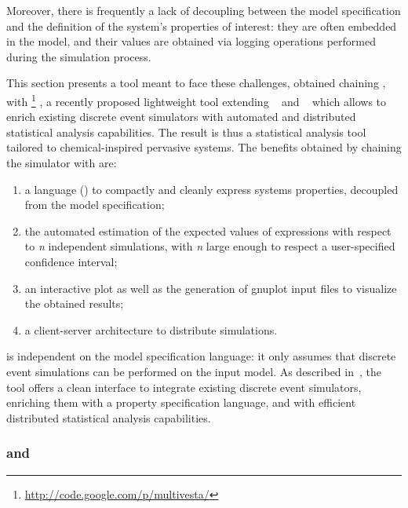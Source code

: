 \documentclass[12pt,a4paper,twoside,openright]{book}
\begin{document}
Moreover, there is frequently a lack of decoupling between the model specification and the definition of the system's properties of interest: they are often embedded in the model, and their values are obtained via logging operations performed during the simulation process.

This section presents a tool meant to face these challenges, obtained chaining \alchemist{}, with \multivesta{}\footnote{\url{http://code.google.com/p/multivesta/}} \cite{multivesta}, a recently proposed lightweight tool extending \vesta{}~\cite{Sen:2005} and \pvesta{}~\cite{AlTurkiM11} which allows to enrich existing discrete event simulators with automated and distributed statistical analysis capabilities.
%
The result is thus a statistical analysis tool tailored to chemical-inspired pervasive systems.
%
The benefits obtained by chaining the simulator with \multivesta{} are:
\begin{enumerate}
 \item a language (\multiquatex) to compactly and cleanly express systems properties, decoupled from the model specification;
 \item the automated estimation of the expected values of \multiquatex{} expressions with respect to \emph{n} independent simulations, with \emph{n} large enough to respect a user-specified confidence interval;
 \item an interactive plot as well as the generation of gnuplot input files to visualize the obtained results;
 \item a client-server architecture to distribute simulations.
\end{enumerate}

\multivesta{} is independent on the model specification language: it only assumes that discrete event simulations can be performed on the input model.
%
As described in~\cite{multivesta}, the tool offers a clean interface to integrate existing discrete event simulators, enriching them with a property specification language, and with efficient distributed statistical analysis capabilities.

\subsubsection{\multivesta{} and \multiquatex{}}
\end{document}
